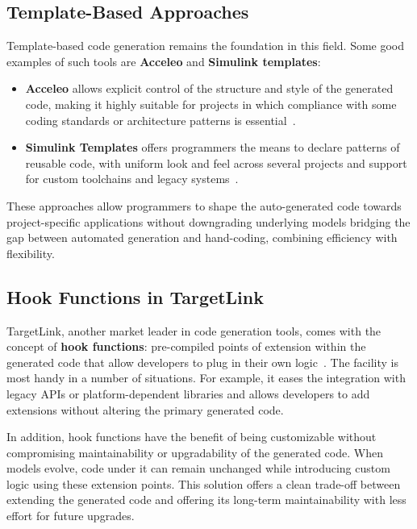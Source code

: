 \subsection{Template-Based Approaches}
\label{sec:template}

Template-based code generation remains the foundation in this field. Some good examples of such tools are \textbf{Acceleo} and \textbf{Simulink templates}: 

\begin{itemize} 
	\item \textbf{Acceleo} allows explicit control of the structure and style of the generated code, making it highly suitable for projects in which compliance with some coding standards or architecture patterns is essential~\cite{AcceleoUserGuide}. 
	\item \textbf{Simulink Templates} offers programmers the means to declare patterns of reusable code, with uniform look and feel across several projects and support for custom toolchains and legacy systems~\cite{simulink_templates}.
\end{itemize}

These approaches allow programmers to shape the auto-generated code towards project-specific applications without downgrading underlying models bridging the gap between automated generation and hand-coding, combining efficiency with flexibility.

\subsection{Hook Functions in TargetLink}
\label{sec:hook:functions}

TargetLink, another market leader in code generation tools, comes with the concept of \textbf{hook functions}: pre-compiled points of extension within the generated code that allow developers to plug in their own logic~\cite{target_link_features}. The facility is most handy in a number of situations. For example, it eases the integration with legacy APIs or platform-dependent libraries and allows developers to add extensions without altering the primary generated code.
\par
In addition, hook functions have the benefit of being customizable without compromising maintainability or upgradability of the generated code. When models evolve, code under it can remain unchanged while introducing custom logic using these extension points. This solution offers a clean trade-off between extending the generated code and offering its long-term maintainability with less effort for future upgrades.

